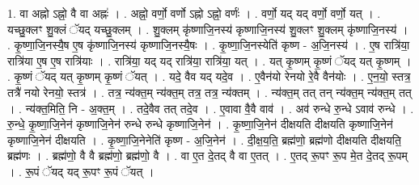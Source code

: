 \documentclass[17pt]{extarticle}
\begin{document}
1. वा अह्नो ऽह्नो॒ वै वा अह्नः॑ । . अह्नो॒ वर्णो॒ वर्णो ऽह्नो ऽह्नो॒ वर्णः॑ । . वर्णो॒ यद् यद् वर्णो॒ वर्णो॒ यत् । . यच्छु॒क्लꣳ शु॒क्लं ॅयद् यच्छु॒क्लम् । . शु॒क्लम् कृ॑ष्णाजि॒नस्य॑ कृष्णाजि॒नस्य॑ शु॒क्लꣳ शु॒क्लम् कृ॑ष्णाजि॒नस्य॑ । . कृ॒ष्णा॒जि॒नस्यै॒ष ए॒ष कृ॑ष्णाजि॒नस्य॑ कृष्णाजि॒नस्यै॒षः । . कृ॒ष्णा॒जि॒नस्येति॑ कृष्ण - अ॒जि॒नस्य॑ । . ए॒ष रात्रि॑या॒ रात्रि॑या ए॒ष ए॒ष रात्रि॑याः । . रात्रि॑या॒ यद् यद् रात्रि॑या॒ रात्रि॑या॒ यत् । . यत् कृ॒ष्णम् कृ॒ष्णं ॅयद् यत् कृ॒ष्णम् । . कृ॒ष्णं ॅयद् यत् कृ॒ष्णम् कृ॒ष्णं ॅयत् । . यदे॒ वैव यद् यदे॒व । . ए॒वैन॑यो रेनयो रे॒वै वैन॑योः । . ए॒न॒यो॒ स्तत्र॒ तत्रै॑ नयो रेनयो॒ स्तत्र॑ । . तत्र॒ न्य॑क्त॒म् न्य॑क्त॒म् तत्र॒ तत्र॒ न्य॑क्तम् । . न्य॑क्त॒म् तत् तन् न्य॑क्त॒म् न्य॑क्त॒म् तत् । . न्य॑क्त॒मिति॒ नि - अ॒क्त॒म् । . तदे॒वैव तत् तदे॒व । . ए॒वावा वै॒वै वाव॑ । . अव॑ रुन्धे रु॒न्धे ऽवाव॑ रुन्धे । . रु॒न्धे॒ कृ॒ष्णा॒जि॒नेन॑ कृष्णाजि॒नेन॑ रुन्धे रुन्धे कृष्णाजि॒नेन॑ । . कृ॒ष्णा॒जि॒नेन॑ दीक्षयति दीक्षयति कृष्णाजि॒नेन॑ कृष्णाजि॒नेन॑ दीक्षयति । . कृ॒ष्णा॒जि॒नेनेति॑ कृष्ण - अ॒जि॒नेन॑ । . दी॒क्ष॒य॒ति॒ ब्रह्म॑णो॒ ब्रह्म॑णो दीक्षयति दीक्षयति॒ ब्रह्म॑णः । . ब्रह्म॑णो॒ वै वै ब्रह्म॑णो॒ ब्रह्म॑णो॒ वै । . वा ए॒त दे॒तद् वै वा ए॒तत् । . ए॒तद् रू॒पꣳ रू॒प मे॒त दे॒तद् रू॒पम् । . रू॒पं ॅयद् यद् रू॒पꣳ रू॒पं ॅयत् । \newline
\end{document}
